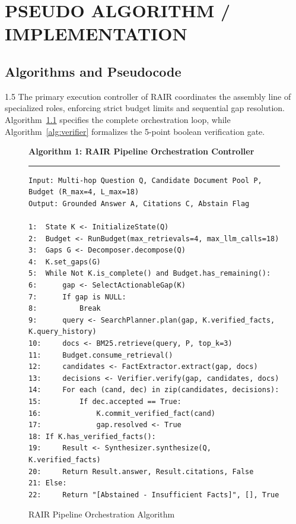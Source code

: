 \documentclass[12pt,a4paper]{report}
\begin{document}

\chapter{PSEUDO ALGORITHM / IMPLEMENTATION}

\section{Algorithms and Pseudocode}
\begin{spacing}{1.5}
The primary execution controller of RAIR coordinates the assembly line of specialized roles, enforcing strict budget limits and sequential gap resolution. Algorithm~\ref{alg:rair_controller} specifies the complete orchestration loop, while Algorithm~\ref{alg:verifier} formalizes the 5-point boolean verification gate.

\begin{figure}[!htbp]
\centering
\begin{mdframed}[backgroundcolor=codebg,linecolor=codeframe,roundcorner=3pt]
\textbf{Algorithm 1: RAIR Pipeline Orchestration Controller}
\vspace{0.15cm}
\hrule
\vspace{0.15cm}
\fontsize{8.5}{11}\selectfont
\begin{verbatim}
Input: Multi-hop Question Q, Candidate Document Pool P, Budget (R_max=4, L_max=18)
Output: Grounded Answer A, Citations C, Abstain Flag

1:  State K <- InitializeState(Q)
2:  Budget <- RunBudget(max_retrievals=4, max_llm_calls=18)
3:  Gaps G <- Decomposer.decompose(Q)
4:  K.set_gaps(G)
5:  While Not K.is_complete() and Budget.has_remaining():
6:      gap <- SelectActionableGap(K)
7:      If gap is NULL:
8:          Break
9:      query <- SearchPlanner.plan(gap, K.verified_facts, K.query_history)
10:     docs <- BM25.retrieve(query, P, top_k=3)
11:     Budget.consume_retrieval()
12:     candidates <- FactExtractor.extract(gap, docs)
13:     decisions <- Verifier.verify(gap, candidates, docs)
14:     For each (cand, dec) in zip(candidates, decisions):
15:         If dec.accepted == True:
16:             K.commit_verified_fact(cand)
17:             gap.resolved <- True
18: If K.has_verified_facts():
19:     Result <- Synthesizer.synthesize(Q, K.verified_facts)
20:     Return Result.answer, Result.citations, False
21: Else:
22:     Return "[Abstained - Insufficient Facts]", [], True
\end{verbatim}
\end{mdframed}
\caption{RAIR Pipeline Orchestration Algorithm}
\label{alg:rair_controller}
\end{figure}


\end{spacing}
\end{document}
